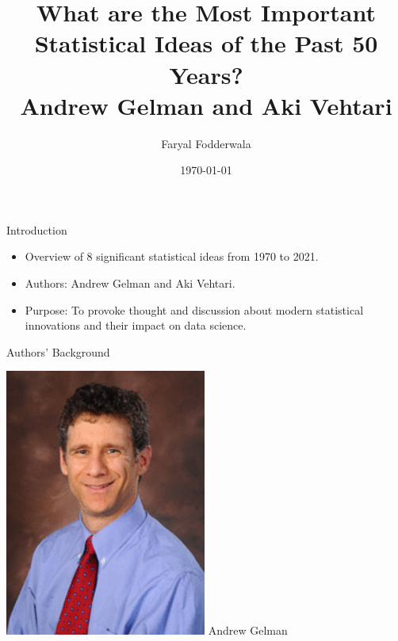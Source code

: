\documentclass{beamer}
\title{What are the Most Important Statistical Ideas of the Past 50 Years?\\
\vspace{0.5em}
\small Andrew Gelman and Aki Vehtari}
\author{Faryal Fodderwala}
\date{\today}
\begin{document}
\frame{\titlepage}

\begin{frame}{Introduction}
\begin{itemize}
    \item Overview of 8 significant statistical ideas from 1970 to 2021.
    \item Authors: Andrew Gelman and Aki Vehtari.
    \item Purpose: To provoke thought and discussion about modern statistical innovations and their impact on data science.
\end{itemize}
\end{frame}

\begin{frame}{Authors' Background}
\begin{minipage}{0.3\textwidth}
    \includegraphics[width=\textwidth]{andrew_gelman.png} 
    \centering
    \small Andrew Gelman

\end{minipage}
\end{frame}
\end{document}
